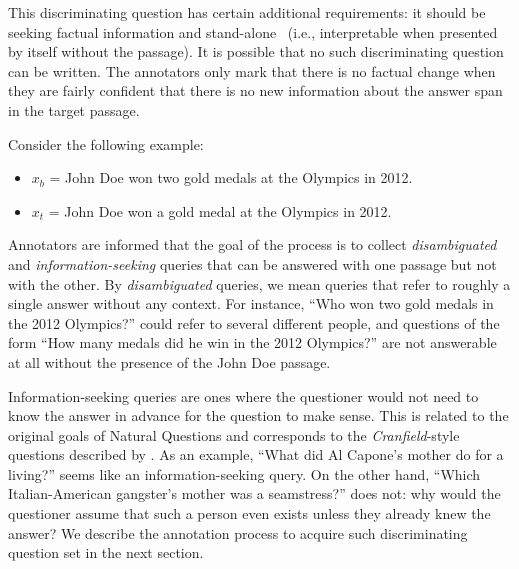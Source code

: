 This discriminating question has certain additional requirements: it should be  seeking factual information and stand-alone~\cite{choi-etal-2021-decontextualization} (i.e., interpretable when presented by itself without the passage). It is possible that no such discriminating question can be written. The annotators only mark that there is no factual change when they are fairly confident that there is no new information about the answer span in the target passage.

Consider the following example:

\begin{itemize}
 \item $x_b $ = John Doe won two gold medals at the Olympics in 2012.
 \item $x_t $ = John Doe won a gold medal at the Olympics in 2012.
\end{itemize}




Annotators are informed that the goal of the process is to collect \textit{disambiguated} and \textit{information-seeking} queries that can be answered with one passage but not with the other. By \textit{disambiguated} queries, we mean queries that refer to roughly a single answer without any context. For instance, ``Who won two gold medals in the 2012 Olympics?'' could refer to several different people, and questions of the form ``How many medals did he win in the 2012 Olympics?'' are not answerable at all without the presence of the John Doe passage.

Information-seeking queries are ones where the questioner would not need to know the answer in advance for the question to make sense. This is related to the original goals of Natural Questions \citep{kwiatkowski-etal-2019-natural} and corresponds to the \emph{Cranfield}-style questions described by \citet{rodriguez-boyd-graber-2021-evaluation}. As an example, ``What did Al Capone's mother do for a living?'' seems like an information-seeking query. On the other hand, ``Which Italian-American gangster's mother was a seamstress?'' does not: why would the questioner assume that such a person even exists unless they already knew the answer?
%
We describe the annotation process to acquire such discriminating question set in the next section. 





